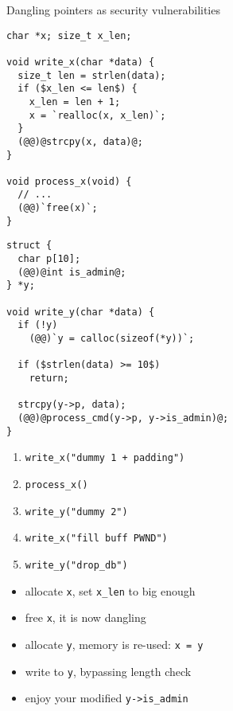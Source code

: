 \documentclass[10pt]{beamer}
\begin{document}
\begin{frame}[fragile]{Dangling pointers as security vulnerabilities}
    \begin{minipage}[t]{0.5\linewidth}
        \begin{lstlisting}[style=tiny]
char *x; size_t x_len;

void write_x(char *data) {
  size_t len = strlen(data);
  if ($x_len <= len$) {
    x_len = len + 1;
    x = `realloc(x, x_len)`;
  }
  (@@)@strcpy(x, data)@;
}

void process_x(void) {
  // ...
  (@@)`free(x)`;
}
        \end{lstlisting}
    \end{minipage}
    \begin{minipage}[t]{0.49\linewidth}
        \pause
        \begin{lstlisting}[style=tiny]
struct {
  char p[10];
  (@@)@int is_admin@;
} *y;

void write_y(char *data) {
  if (!y)
    (@@)`y = calloc(sizeof(*y))`;

  if ($strlen(data) >= 10$)
    return;

  strcpy(y->p, data);
  (@@)@process_cmd(y->p, y->is_admin)@;
}
        \end{lstlisting}
    \end{minipage}
    \pause
    \scriptsize
    \lstset{style=tiny}
    \begin{minipage}{0.5\linewidth}
        \begin{enumerate}
            \item<3-> \lstinline[style=tiny]!write_x("dummy 1 + padding")!
            \item<4-> \lstinline[style=tiny]!process_x()!
            \item<5-> \lstinline[style=tiny]!write_y("dummy 2")!
            \item<6-> \lstinline[style=tiny]!write_x("fill buff PWND")!
            \item<7-> \lstinline[style=tiny]!write_y("drop_db")!
        \end{enumerate}
    \end{minipage}
    \begin{minipage}{0.49\linewidth}
        \begin{itemize}
            \item<3-> allocate \lstinline!x!, set \lstinline!x_len! to big enough
            \item<4-> free \lstinline!x!, it is now dangling
            \item<5-> allocate \lstinline!y!, memory is re-used: \lstinline!x = y!
            \item<6-> write to \lstinline!y!, bypassing length check
            \item<7-> enjoy your modified \lstinline!y->is_admin!
        \end{itemize}
    \end{minipage}
\end{frame}
\end{document}
